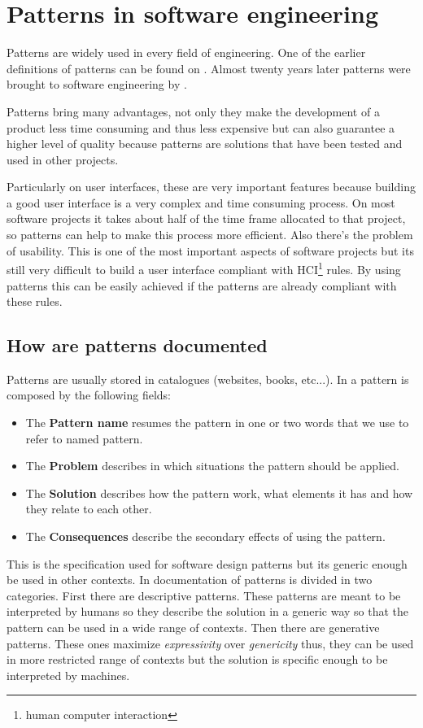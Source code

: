 \section{Patterns in software engineering}
\label{section:Patterns_in_software_engineering}
Patterns are widely used in every field of engineering. One of the earlier definitions of patterns can be found on \cite{A_Pattern_Language_Towns_Buildings_Construction}. Almost twenty years later patterns were brought to software engineering by \cite{Design_Patterns}.

Patterns bring many advantages, not only they make the development of a product less time consuming and thus less expensive but can also guarantee a higher level of quality because patterns are solutions that have been tested and used in other projects.

Particularly on user interfaces, these are very important features because building a good user interface is a very complex and time consuming process. On most software projects it takes about half of the time frame allocated to that project, so patterns can help to make this process more efficient. Also there's the problem of usability. This is one of the most important aspects of software projects but its still very difficult to build a user interface compliant with HCI\footnote{human computer interaction} rules. By using patterns this can be easily achieved if the patterns are already compliant with these rules.

\subsection{How are patterns documented}
Patterns are usually stored in catalogues (websites, books, etc...). In \cite{Design_Patterns} a pattern is composed by the following fields:
\begin{itemize}
\item The \textbf{Pattern name} resumes the pattern in one or two words that we use to refer to named pattern.
\item The \textbf{Problem} describes in which situations the pattern should be applied.
\item The \textbf{Solution} describes how the pattern work, what elements it has and how they relate to each other.
\item The \textbf{Consequences} describe the secondary effects of using the pattern.
\end{itemize}
This is the specification used for software design patterns but its generic enough be used in other contexts.
In \cite{Generative_pattern-based_design_of_user_interfaces} documentation of patterns is divided in two categories. First there are descriptive patterns. These patterns are meant to be interpreted by humans so they describe the solution in a generic way so that the pattern can be used in a wide range of contexts. Then there are generative patterns. These ones maximize \textit{expressivity} over \textit{genericity} thus, they can be used in more restricted range of contexts but the solution is specific enough to be interpreted by machines. 

